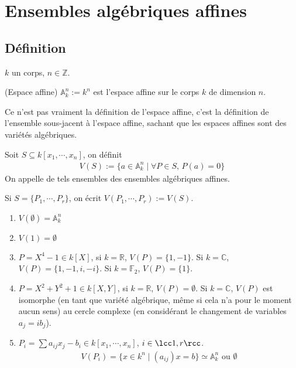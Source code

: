 \chapter{Ensembles algébriques affines}
    \section{Définition}
        $k$ un corps, $n \in \mathbb{Z}$.
        \begin{defi} (Espace affine)
            $\mathbb{A}^n_k := k^n$ est l'espace affine sur le corps $k$ de dimension $n$.
        \end{defi}
        \begin{remq}
            Ce n'est pas vraiment la définition de l'espace affine, c'est la définition de l'ensemble sous-jacent à l'espace affine, sachant que les espaces affines sont des variétés algébriques.
        \end{remq}
        \begin{defi}
            Soit $S \subseteq k[x_1, \cdots, x_n]$, on définit
            \begin{align*}
                V(S) := \{a \in \mathbb{A}_k^n \mid \forall P \in S ,\, P(a) = 0 \}
            \end{align*}
            On appelle de tels ensembles des ensembles algébriques affines.
        \end{defi}
        \begin{remq}
            Si $S = \{P_1, \cdots, P_r\}$, on écrit $V(P_1, \cdots, P_r) := V(S)$.
        \end{remq}
        \begin{expl}
            \begin{enumerate}
                \item $V(\emptyset) = \mathbb{A}_k^n$
                \item $V(1) = \emptyset$
                \item $P = X^4 - 1 \in k[X]$, si $k = \mathbb{R}$, $V(P) = \{1, -1\}$. Si $k = \mathbb{C}$, $V(P) = \{1,-1,i,-i\}$. Si $k = \mathbb{F}_2$, $V(P) = \{1\}$.
                \item $P = X^2 + Y^2 + 1 \in k[X,Y]$, si $k = \mathbb{R}$, $V(P) = \emptyset$. Si $k = \mathbb{C}$, $V(P)$ est isomorphe (en tant que variété algébrique, même si cela n'a pour le moment aucun sens) au cercle complexe (en considérant le changement de variables $a_j = ib_j$).
                \item $P_i = \sum a_{ij} x_j - b_i \in k[x_1, \cdots, x_n]$, $i \in \lcc 1,r \rcc$.
                \begin{align*}
                    V(P_i) = \{x \in k^n \mid (a_{ij})x = b\} \simeq \mathbb{A}_k^n \text{ ou } \emptyset
                \end{align*}
            \end{enumerate}
        \end{expl}
